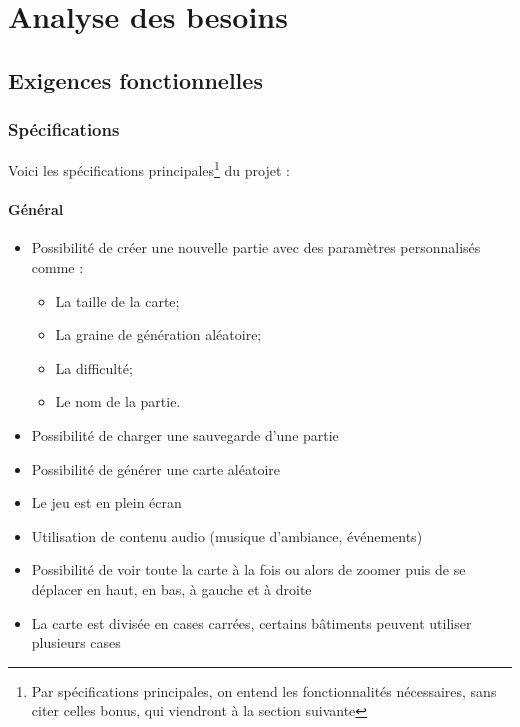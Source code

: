 \documentclass[a4paper,10pt,openany,oneside]{report}
\begin{document}
\chapter{Analyse des besoins}
\thispagestyle{headings}
\section{Exigences fonctionnelles}
\subsection{Spécifications}
Voici les spécifications principales\footnote{Par spécifications principales, on entend les fonctionnalités nécessaires, sans citer celles bonus, qui viendront à la section suivante} du projet :
\subsubsection{Général}
\begin{itemize}
\item Possibilité de créer une nouvelle partie avec des paramètres personnalisés comme :
\begin{itemize}
\item La taille de la carte;
\item La graine de génération aléatoire;
\item La difficulté;
\item Le nom de la partie.
\end{itemize}
\item Possibilité de charger une sauvegarde d'une partie
\item Possibilité de générer une carte aléatoire
\item Le jeu est en plein écran
\item Utilisation de contenu audio (musique d'ambiance, événements)
\item Possibilité de voir toute la carte à la fois ou alors de zoomer puis de se déplacer en haut, en bas, à gauche et à droite
\item La carte est divisée en cases carrées, certains bâtiments peuvent utiliser plusieurs cases
\end{itemize}
\end{document}
